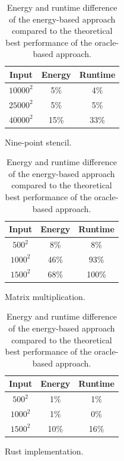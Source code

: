 \begin{table}[ht]
    \centering
    \begin{subtable}{0.33\linewidth}
        \centering
        \begin{tabular}{ccc}\hline
            Input     & Energy & Runtime \\\hline
            $10000^2$ &    5\% &     4\% \\
            $25000^2$ &    5\% &     5\% \\
            $40000^2$ &   15\% &    33\% \\\hline
        \end{tabular}
        \caption{Nine-point stencil.}
        \label{tab:oracle-stencil}
    \end{subtable}%
    \begin{subtable}{0.33\linewidth}
        \centering
        \begin{tabular}{ccc}\hline
            Input    & Energy & Runtime \\\hline
            $ 500^2$ &    8\% &     8\% \\
            $1000^2$ &   46\% &    93\% \\
            $1500^2$ &   68\% &   100\% \\\hline
        \end{tabular}
        \caption{Matrix multiplication.}
        \label{tab:oracle-matmul}
    \end{subtable}%
    \begin{subtable}{0.33\linewidth}
        \centering
        \begin{tabular}{ccc}\hline
            Input    & Energy & Runtime \\\hline
            $ 500^2$ &    1\% &     1\% \\
            $1000^2$ &    1\% &     0\% \\
            $1500^2$ &   10\% &    16\% \\\hline
        \end{tabular}
        \caption{Rust implementation.}
        \label{tab:oracle-rust}
    \end{subtable}%
    \caption{Energy and runtime difference of the energy-based approach compared to the theoretical best performance of the oracle-based approach.}
    \label{fig:oracle}
\end{table}

